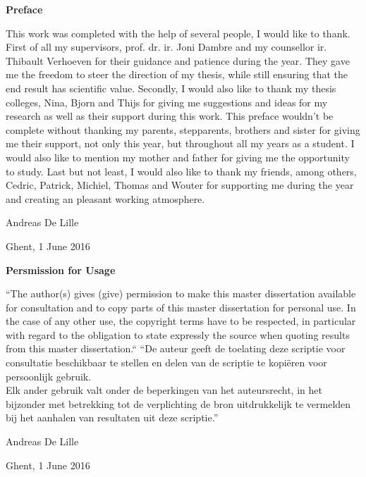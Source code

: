 \newpage

\noindent \textbf{\huge Preface}

\vspace{1.5cm}

\noindent

This work was completed with the help of several people, I would like to thank. First of all my supervisors, prof. dr. ir. Joni Dambre and my counsellor ir. Thibault Verhoeven for their guidance and patience during the year. They gave me the freedom to steer the direction of my thesis, while still ensuring that the end result has scientific value. Secondly, I would also like to thank my thesis colleges, Nina, Bjorn and Thijs for giving me suggestions and ideas for my research as well as their support during this work.
\npar
This preface wouldn't be complete without thanking my parents, stepparents, brothers and sister for giving me their support, not only this year, but throughout all my years as a student. I would also like to mention my mother and father for giving me the opportunity to study.
\npar
Last but not least, I would also like to thank my friends, among others, Cedric, Patrick, Michiel, Thomas and Wouter for supporting me during the year and creating an pleasant working atmosphere. 

\addvspace{3cm}

\hfill \noindent Andreas De Lille

\hfill \noindent Ghent, 1 June 2016

\clearpage

\noindent \textbf{\huge Persmission for Usage}
\vspace{1.5cm}

\noindent
``The author(s) gives (give) permission to make this master dissertation available for consultation
and to copy parts of this master dissertation for personal use.
 In the case of any other use, the copyright terms have to be respected, in particular with regard to
the obligation to state expressly the source when quoting results from this master dissertation.``
\npar
``De auteur geeft de toelating deze scriptie voor consultatie beschikbaar
te stellen en delen van de scriptie te kopi\"eren voor persoonlijk
gebruik.\\
Elk ander gebruik valt onder de beperkingen van het auteursrecht,
in het bijzonder met betrekking tot de verplichting de bron uitdrukkelijk
te vermelden bij het aanhalen van resultaten uit deze scriptie.''

\addvspace{4cm}

\hfill \noindent Andreas De Lille

\hfill \noindent Ghent, 1 June 2016

